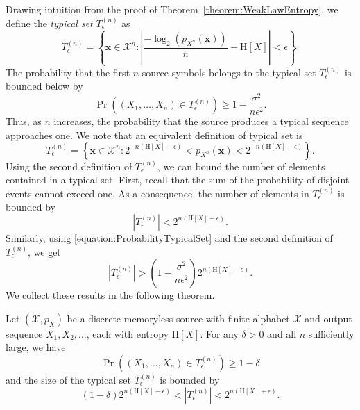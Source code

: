 Drawing intuition from the proof of Theorem~\ref{theorem:WeakLawEntropy}, we define the \emph{typical set} $T_{\epsilon}^{(n)}$ as
\begin{equation*}
T_{\epsilon}^{(n)}
= \left\{ \mathbf{x} \in \mathcal{X}^n :
\left| \frac{- \log_2 \left( p_{X^n} (\mathbf{x}) \right)}{n} - \mathrm{H}[X] \right|
< \epsilon \right\} .
\end{equation*}
The probability that the first $n$ source symbols belongs to the typical set $T_{\epsilon}^{(n)}$ is bounded below by
\begin{equation} \label{equation:ProbabilityTypicalSet}
\Pr \left( (X_1, \ldots, X_n) \in T_{\epsilon}^{(n)} \right) \geq 1 - \frac{\sigma^2}{n \epsilon^2} .
\end{equation}
Thus, as $n$ increases, the probability that the source produces a typical sequence approaches one.
We note that an equivalent definition of typical set is
\begin{equation*}
T_{\epsilon}^{(n)}
= \left\{ \mathbf{x} \in \mathcal{X}^n :
2^{- n (\mathrm{H}[X] + \epsilon)} < p_{X^n} (\mathbf{x})
< 2^{- n (\mathrm{H}[X] - \epsilon)} \right\} .
\end{equation*}
Using the second definition of $T_{\epsilon}^{(n)}$, we can bound the number of elements contained in a typical set.
First, recall that the sum of the probability of disjoint events cannot exceed one.
As a consequence, the number of elements in $T_{\epsilon}^{(n)}$ is bounded by
\begin{equation*}
\left| T_{\epsilon}^{(n)} \right| < 2^{n (\mathrm{H}[X] + \epsilon)} .
\end{equation*}
Similarly, using \eqref{equation:ProbabilityTypicalSet} and the second definition of $T_{\epsilon}^{(n)}$, we get
\begin{equation*}
\left| T_{\epsilon}^{(n)} \right| > \left( 1 - \frac{\sigma^2}{n \epsilon^2} \right)
2^{n (\mathrm{H}[X] - \epsilon)} .
\end{equation*}
We collect these results in the following theorem.

\begin{theorem} \label{theorem:AEP}
Let $(\mathcal{X}, p_X)$ be a discrete memoryless source with finite alphabet $\mathcal{X}$ and output sequence $X_1, X_2, \ldots$, each with entropy $\mathrm{H}[X]$.
For any $\delta > 0$ and all $n$ sufficiently large, we have
\begin{equation*}
\Pr \left( (X_1, \ldots, X_n) \in T_{\epsilon}^{(n)} \right) \geq 1 - \delta
\end{equation*}
and the size of the typical set $T_{\epsilon}^{(n)}$ is bounded by
\begin{equation*}
(1 - \delta) 2^{n (\mathrm{H}[X] - \epsilon)} <
\left| T_{\epsilon}^{(n)} \right| < 2^{n (\mathrm{H}[X] + \epsilon)} .
\end{equation*}
\end{theorem}

